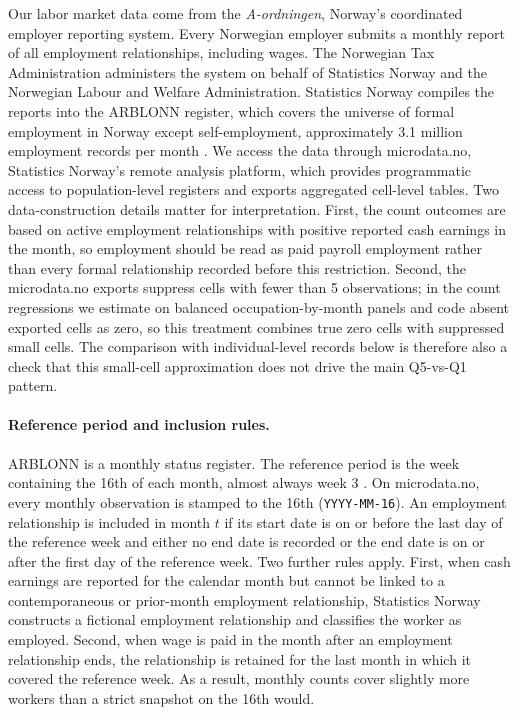 \documentclass[12pt]{article}
\begin{document}
Our labor market data come from the \emph{A-ordningen}, Norway's coordinated employer reporting system. Every Norwegian employer submits a monthly report of all employment relationships, including wages. The Norwegian Tax Administration administers the system on behalf of Statistics Norway and the Norwegian Labour and Welfare Administration. Statistics Norway compiles the reports into the ARBLONN register, which covers the universe of formal employment in Norway except self-employment, approximately 3.1 million employment records per month \citep{ssb_arblonn_doc}. We access the data through microdata.no, Statistics Norway's remote analysis platform, which provides programmatic access to population-level registers and exports aggregated cell-level tables. Two data-construction details matter for interpretation. First, the count outcomes are based on active employment relationships with positive reported cash earnings in the month, so employment should be read as paid payroll employment rather than every formal relationship recorded before this restriction. Second, the microdata.no exports suppress cells with fewer than 5 observations; in the count regressions we estimate on balanced occupation-by-month panels and code absent exported cells as zero, so this treatment combines true zero cells with suppressed small cells. The comparison with individual-level records below is therefore also a check that this small-cell approximation does not drive the main Q5-vs-Q1 pattern.

\paragraph{Reference period and inclusion rules.}
ARBLONN is a monthly status register. The reference period is the week containing the 16th of each month, almost always week 3 \citep{ssb_klassifisering}. On microdata.no, every monthly observation is stamped to the 16th (\texttt{YYYY-MM-16}). An employment relationship is included in month $t$ if its start date is on or before the last day of the reference week and either no end date is recorded or the end date is on or after the first day of the reference week. Two further rules apply. First, when cash earnings are reported for the calendar month but cannot be linked to a contemporaneous or prior-month employment relationship, Statistics Norway constructs a fictional employment relationship and classifies the worker as employed. Second, when wage is paid in the month after an employment relationship ends, the relationship is retained for the last month in which it covered the reference week. As a result, monthly counts cover slightly more workers than a strict snapshot on the 16th would.
\end{document}
